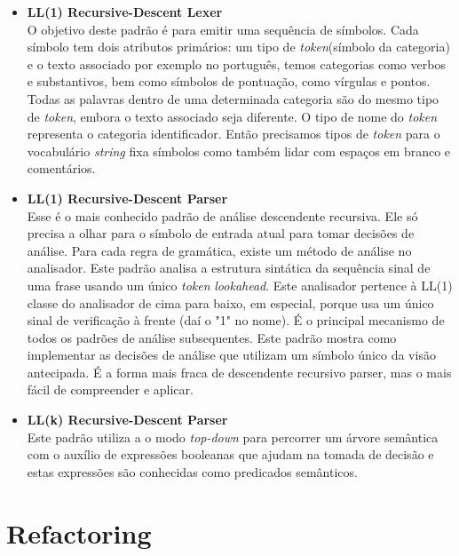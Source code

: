 \begin{itemize}
	\item \textbf{LL(1) Recursive-Descent Lexer}\\
	O objetivo deste padr\~{a}o \'{e} para emitir uma sequência de s\'{i}mbolos. Cada s\'{i}mbolo tem dois atributos prim\'{a}rios: um tipo de \textit{token}(s\'{i}mbolo da categoria) e o texto associado por exemplo 
	no português, temos categorias como verbos e substantivos, bem como s\'{i}mbolos de pontua\c{c}\~{a}o, como v\'{i}rgulas e pontos. Todas as palavras dentro de uma determinada categoria s\~{a}o do mesmo tipo de \textit{token}, embora o texto associado seja diferente. O tipo de nome do \textit{token} representa o categoria identificador. Ent\~{a}o precisamos tipos de \textit{token} para o vocabul\'{a}rio \textit{string} fixa s\'{i}mbolos como tamb\'{e}m lidar com espa\c{c}os em branco e coment\'{a}rios.
	\item \textbf{LL(1) Recursive-Descent Parser}\\
	Esse \'{e} o mais conhecido padr\~{a}o de an\'{a}lise descendente recursiva. Ele s\'{o} precisa	a olhar para o s\'{i}mbolo de entrada atual para tomar decis\~{o}es de an\'{a}lise. Para cada regra de gram\'{a}tica, existe um m\'{e}todo de an\'{a}lise no analisador. Este padr\~{a}o analisa a estrutura sint\'{a}tica da sequência sinal de uma frase usando um \'{u}nico \textit{token} \textit{lookahead}. Este analisador pertence à LL(1) classe do analisador de cima para baixo, em especial, porque usa um \'{u}nico sinal de verifica\c{c}\~{a}o à frente (da\'{i} o "1" no nome). É o principal mecanismo de todos os padr\~{o}es de an\'{a}lise subsequentes. Este padr\~{a}o mostra como implementar as decis\~{o}es de an\'{a}lise que utilizam um s\'{i}mbolo \'{u}nico da vis\~{a}o antecipada. É a forma mais fraca de descendente recursivo parser, mas o mais f\'{a}cil de compreender e aplicar.
	\item \textbf{LL(k) Recursive-Descent Parser}\\
	Este padr\~{a}o utiliza a o modo \textit{top-down} para percorrer um \'{a}rvore sem\^{a}ntica com o aux\'{i}lio de express\~{o}es booleanas que ajudam na tomada de decis\~{a}o e estas express\~{o}es s\~{a}o conhecidas como predicados sem\^{a}nticos.
\end{itemize}




\section{Refactoring}\label{sec:refactoring}

